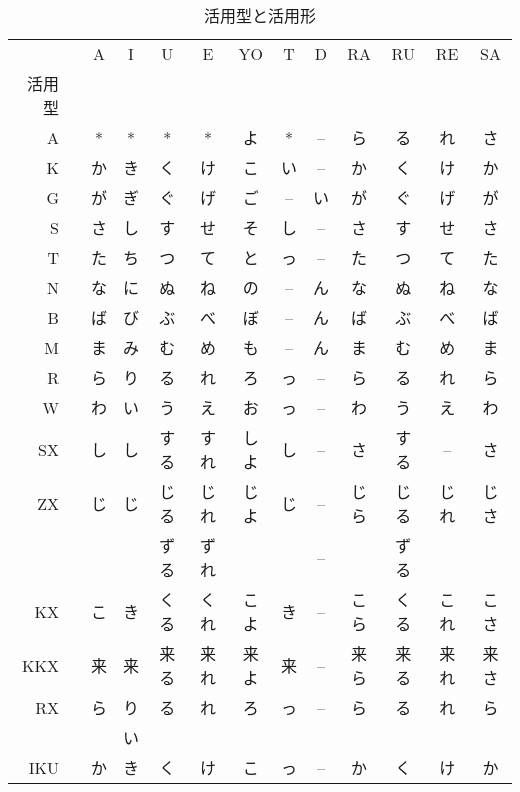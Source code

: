 \begin{table*}
\begin{center}
\begin{tabular}{|rl|ccccccccccc|}
\hline
& \hspace{-5mm}{\tiny 活用形}  & A  & I  & U  & E  & YO & T  & D  & RA & RU & RE & SA \\
{\tiny 活用型} &&&&&&&&&&&&\\
\hline
A && *  & *  & *  & *  & よ & *  & -- & ら & る & れ & さ \\
K && か & き & く & け & こ & い & -- & か & く & け & か \\
G && が & ぎ & ぐ & げ & ご & -- & い & が & ぐ & げ & が \\
S && さ & し & す & せ & そ & し & -- & さ & す & せ & さ \\
T && た & ち & つ & て & と & っ & -- & た & つ & て & た \\
N && な & に & ぬ & ね & の & -- & ん & な & ぬ & ね & な \\
B && ば & び & ぶ & べ & ぼ & -- & ん & ば & ぶ & べ & ば \\
M && ま & み & む & め & も & -- & ん & ま & む & め & ま \\
R && ら & り & る & れ & ろ & っ & -- & ら & る & れ & ら \\
W && わ & い & う & え & お & っ & -- & わ & う & え & わ \\
SX && し & し & する & すれ & しよ & し & --& さ & する & --& さ \\
ZX && じ & じ & じる & じれ & じよ & じ & --& じら & じる & じれ & じさ \\
   &&    &    & ずる & ずれ &      &    & --&      & ずる &      &      \\
KX && こ & き & くる & くれ & こよ & き & --& こら & くる & これ & こさ \\
KKX && 来 & 来 & 来る & 来れ & 来よ & 来 & --& 来ら & 来る & 来れ & 来さ \\
RX && ら & り & る & れ & ろ & っ & -- & ら & る & れ & ら \\
   &&  & い &  &  &  &  &   &  &  &  &  \\
IKU && か & き & く & け & こ & っ & -- & か & く & け & か \\
\hline
\end{tabular}
\end{center}
\caption{活用型と活用形}
\label{katuyou1}
\end{table*}

